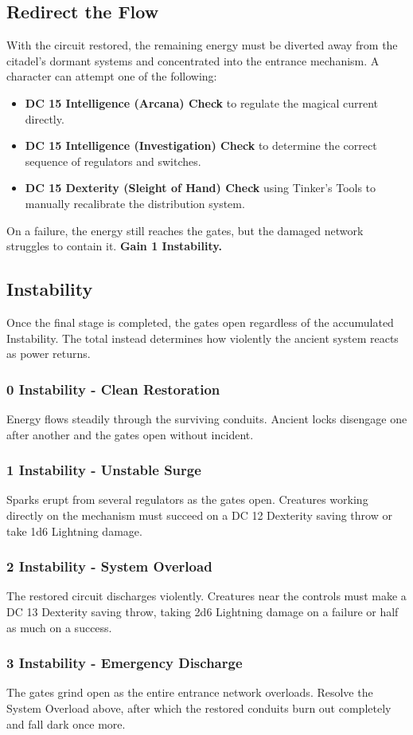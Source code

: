 \subsection*{Redirect the Flow}
{\entryfont With the circuit restored, the remaining energy must be diverted away from the citadel’s dormant systems and concentrated into the entrance mechanism. A character can attempt one of the following:
\begin{itemize}[label=\textbf{\textbullet}]
	\item \textbf{DC 15 Intelligence (Arcana) Check} to regulate the magical current directly.
	\item \textbf{DC 15 Intelligence (Investigation) Check} to determine the correct sequence of regulators and switches.
	\item \textbf{DC 15 Dexterity (Sleight of Hand) Check} using Tinker's Tools to manually recalibrate the distribution system.
\end{itemize}
On a failure, the energy still reaches the gates, but the damaged network struggles to contain it. \textbf{Gain 1 Instability.}}
\subsection*{Instability}
{\entryfont Once the final stage is completed, the gates open regardless of the accumulated Instability. The total instead determines how violently the ancient system reacts as power returns.}
\subsubsection*{0 Instability - Clean Restoration}
{\entryfont Energy flows steadily through the surviving conduits. Ancient locks disengage one after another and the gates open without incident.}
\subsubsection*{1 Instability - Unstable Surge}
{\entryfont Sparks erupt from several regulators as the gates open. Creatures working directly on the mechanism must succeed on a DC 12 Dexterity saving throw or take 1d6 Lightning damage.}
\subsubsection*{2 Instability - System Overload}
{\entryfont The restored circuit discharges violently. Creatures near the controls must make a DC 13 Dexterity saving throw, taking 2d6 Lightning damage on a failure or half as much on a success.}
\subsubsection*{3 Instability - Emergency Discharge}
{\entryfont The gates grind open as the entire entrance network overloads. Resolve the System Overload above, after which the restored conduits burn out completely and fall dark once more.}